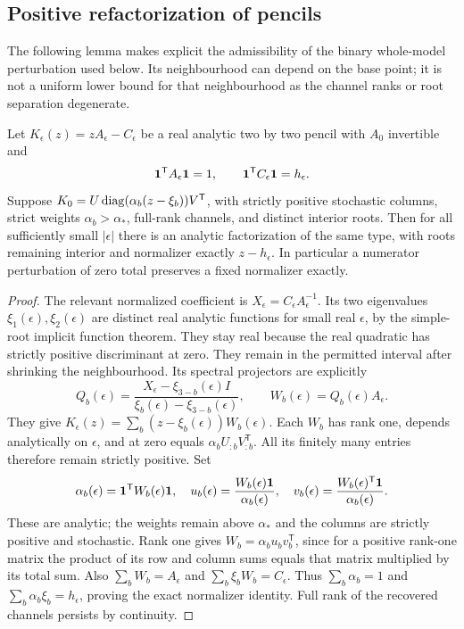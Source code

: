 \subsection{Positive refactorization of pencils}
The following lemma makes explicit the admissibility of the binary
whole-model perturbation used below. Its neighbourhood can depend on
the base point; it is not a uniform lower bound for that neighbourhood
as the channel ranks or root separation degenerate.
\begin{lemma}
\label{lem:binary-refactor-v93}
Let $K_\epsilon(z)=zA_\epsilon-C_\epsilon$ be a real analytic two by
two pencil with $A_0$ invertible and
\[
 \mathbf 1^{\mathsf T}A_\epsilon\mathbf 1=1,\qquad
 \mathbf 1^{\mathsf T}C_\epsilon\mathbf 1=h_\epsilon.
\]
Suppose $K_0=U\operatorname{diag}(\alpha_b(z-\xi_b))V^{\mathsf T}$, with
strictly positive stochastic columns, strict weights
$\alpha_b>\alpha_*$, full-rank channels, and distinct interior roots.
Then for all sufficiently small $|\epsilon|$ there is an analytic
factorization of the same type, with roots remaining interior and
normalizer exactly $z-h_\epsilon$. In particular a numerator
perturbation of zero total preserves a fixed normalizer exactly.
\end{lemma}
\begin{proof}
The relevant normalized coefficient is
$X_\epsilon=C_\epsilon A_\epsilon^{-1}$.
Its two eigenvalues $\xi_1(\epsilon),\xi_2(\epsilon)$ are distinct
real analytic functions for small real $\epsilon$, by the simple-root
implicit function theorem. They stay real because the real quadratic
has strictly positive discriminant at zero. They remain in the
permitted interval after shrinking the neighbourhood. Its spectral
projectors are explicitly
\[
 Q_b(\epsilon)=
 \frac{X_\epsilon-\xi_{3-b}(\epsilon)I}
      {\xi_b(\epsilon)-\xi_{3-b}(\epsilon)},\qquad
 W_b(\epsilon)=Q_b(\epsilon)A_\epsilon.
\]
They give
$K_\epsilon(z)=\sum_b(z-\xi_b(\epsilon))W_b(\epsilon)$.
Each $W_b$ has rank one, depends analytically on $\epsilon$, and at
zero equals $\alpha_bU_{:b}V_{:b}^{\mathsf T}$.
All its finitely many entries therefore remain strictly positive.
Set
\[
 \alpha_b(\epsilon)=\mathbf 1^{\mathsf T}W_b(\epsilon)\mathbf 1,
 \quad u_b(\epsilon)=\frac{W_b(\epsilon)\mathbf 1}{\alpha_b(\epsilon)},
 \quad v_b(\epsilon)=\frac{W_b(\epsilon)^{\mathsf T}\mathbf 1}
                           {\alpha_b(\epsilon)}.
\]
These are analytic; the weights remain above $\alpha_*$ and the
columns are strictly positive and stochastic. Rank one gives
$W_b=\alpha_bu_bv_b^{\mathsf T}$, since for a positive rank-one
matrix the product of its row and column sums equals that matrix
multiplied by its total sum. Also $\sum_bW_b=A_\epsilon$ and
$\sum_b\xi_bW_b=C_\epsilon$. Thus $\sum_b\alpha_b=1$ and
$\sum_b\alpha_b\xi_b=h_\epsilon$, proving the exact normalizer
identity. Full rank of the recovered channels persists by continuity.
\end{proof}

